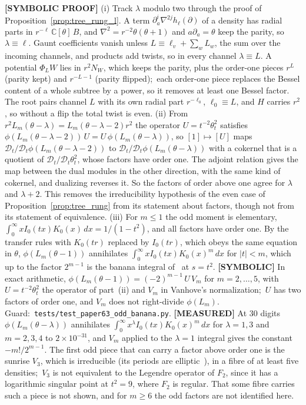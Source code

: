 \documentclass[aps,pra,twocolumn,superscriptaddress,longbibliography]{revtex4-2}
\begin{document}
\textbf{[SYMBOLIC PROOF]} (i) Track $\lambda$ modulo two through the proof of
Proposition~\ref{prop:tree_rung_l}.  A term
$\partial_{a}^i\nabla^{2j}h_\ell(\partial)$ of a density has radial parts in
$r^{-\ell}\,\mathbb{C}[\theta]\,B$, and $\nabla^2=r^{-2}\theta(\theta+1)$ and
$a\partial_a=\theta$ keep the parity, so $\lambda\equiv\ell$.  Gaunt
coefficients vanish unless $L\equiv\ell_v+\sum_wL_w$, the sum over the incoming channels, and products add twists, so in
every channel $\lambda\equiv L$.  A potential $\Phi_LW$ lies in $r^2N_W$, which
keeps the parity, plus the order-one pieces $r^{L}$ (parity kept) and
$r^{-L-1}$ (parity flipped);\ each order-one piece replaces the Bessel content
of a whole subtree by a power, so it removes at least one Bessel factor.  The
root pairs channel $L$ with its own radial part $r^{-\ell_0}$, $\ell_0\equiv L$,
and $H$ carries $r^2$, so without a flip the total twist is even.
(ii) From $r^2L_m(\theta-\lambda)=L_m(\theta-\lambda-2)r^2$ the operator
$U=t^{-2}\theta_t^2$ satisfies
$\phi(L_m(\theta-\lambda-2))\,U=U\,\phi(L_m(\theta-\lambda))$, so $[1]\mapsto[U]$
maps $\mathcal{D}_t/\mathcal{D}_t\phi(L_m(\theta-\lambda-2))$ to
$\mathcal{D}_t/\mathcal{D}_t\phi(L_m(\theta-\lambda))$ with a cokernel that is a
quotient of $\mathcal{D}_t/\mathcal{D}_t\theta_t^2$, whose factors have order
one.  The adjoint relation gives the map between the dual modules in the
other direction, with the same kind of cokernel, and dualizing reverses it.  So
the factors of order above one agree for $\lambda$ and $\lambda+2$.  This
removes the irreducibility hypothesis of the even case of
Proposition~\ref{prop:tree_rung} from its statement about factors, though not
from its statement of equivalence.
(iii) For $m\le1$ the odd moment is elementary,
$\int_0^\infty xI_0(tx)K_0(x)\,dx=1/(1-t^2)$, and all factors have order one.  By the transfer rules with $K_0(tr)$ replaced by $I_0(tr)$, which obeys
the same equation in $\theta$, $\phi(L_m(\theta-1))$ annihilates
$\int_0^\infty xI_0(tx)K_0(x)^m\,dx$ for $|t|<m$, which up to the factor
$2^{m-1}$ is the banana integral of~\cite{vanhove2014} at $s=t^2$.
\textbf{[SYMBOLIC]} In exact arithmetic,
$\phi(L_m(\theta-1))=(-2)^{m-1}\,U\,V_m$ for $m=2,\dots,5$, with $U=t^{-2}\theta_t^2$
the operator of part~(ii) and $V_m$ in Vanhove's normalization;\ $U$ has two
factors of order one, and $V_m$ does not right-divide $\phi(L_m)$.  Guard:\
\texttt{tests/test\_paper63\_odd\_banana.py}.  \textbf{[MEASURED]} At 30 digits
$\phi(L_m(\theta-\lambda))$ annihilates $\int_0^\infty x^\lambda I_0(tx)K_0(x)^m\,dx$
for $\lambda=1,3$ and $m=2,3,4$ to $2\times10^{-31}$, and $V_m$ applied to the
$\lambda=1$ integral gives the constant $-m!/2^{m-1}$.
The first odd piece that can carry a factor above order one is the sunrise
$V_3$, which is irreducible (its periods are elliptic~\cite{blochvanhove2015}), in a fibre of at least five densities;\ $V_3$ is not equivalent to the
Legendre operator of $F_2$, since it has a logarithmic singular point at
$t^2=9$, where $F_2$ is regular.  That some fibre carries such a piece is not
shown, and for $m\ge6$ the odd factors are not identified here.
\end{document}
